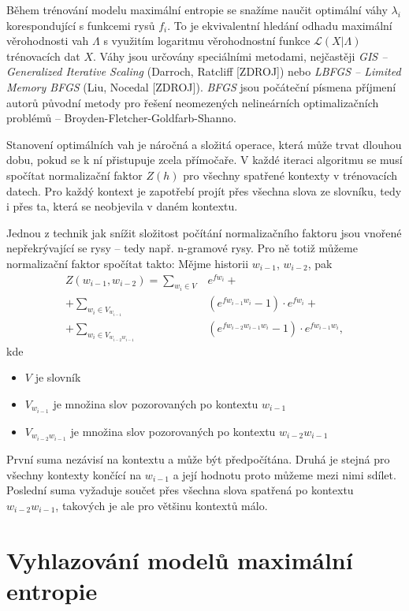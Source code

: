 \documentclass[12pt,a4paper]{report}
\begin{document}
Během trénování modelu maximální entropie se snažíme naučit optimální váhy $\lambda_i$ korespondující s funkcemi rysů $f_i$. To je ekvivalentní hledání odhadu maximální věrohodnosti vah $\Lambda$ s využitím logaritmu věrohodnostní funkce $\mathcal{L}(X|\Lambda)$ trénovacích dat $X$. Váhy jsou určovány speciálními metodami, nejčastěji \textit{GIS -- Generalized Iterative Scaling} (Darroch, Ratcliff [ZDROJ]) nebo \textit{LBFGS -- Limited Memory BFGS} (Liu, Nocedal [ZDROJ]). \textit{BFGS} jsou počáteční písmena příjmení autorů původní metody pro řešení neomezených nelineárních optimalizačních problémů -- Broyden-Fletcher-Goldfarb-Shanno.

Stanovení optimálních vah je náročná a složitá operace, která může trvat dlouhou dobu, pokud se k ní přistupuje zcela přímočaře. V každé iteraci algoritmu se musí spočítat normalizační faktor $Z(h)$ pro všechny spatřené kontexty v trénovacích datech. Pro každý kontext je zapotřebí projít přes všechna slova ze slovníku, tedy i přes ta, která se neobjevila v daném kontextu.

Jednou z technik jak snížit složitost počítání normalizačního faktoru jsou vnořené nepřekrývající se rysy -- tedy např. n-gramové rysy. Pro ně totiž můžeme normalizační faktor spočítat takto: Mějme historii $w_{i-1}$, $w_{i-2}$, pak
\begin{equation}
\begin{split}
Z(w_{i-1}, w_{i-2}) = \sum_{w_i \in V} & e^{fw_i} + \\ 
+ \sum_{w_i \in V_{w_{i-1}}} & (e^{fw_{i-1}w_i} - 1) \cdot e^{fw_i} + \\
+ \sum_{w_i \in V_{w_{i-2} w_{i-1}}} & (e^{fw_{i-2}w_{i-1}w_i} -1) \cdot e^{fw_{i-1}w_i},
\end{split}
\end{equation}
kde \begin{itemize}
\item{$V$ je slovník}
\item{$V_{w_{i-1}}$ je množina slov pozorovaných po kontextu $w_{i-1}$}
\item{$V_{w_{i-2}w_{i-1}}$ je množina slov pozorovaných po kontextu $w_{i-2}w_{i-1}$}
\end{itemize}
První suma nezávisí na kontextu a může být předpočítána. Druhá je stejná pro všechny kontexty končící na $w_{i-1}$ a její hodnotu proto můžeme mezi nimi sdílet. Poslední suma vyžaduje součet přes všechna slova spatřená po kontextu $w_{i-2}w_{i-1}$, takových je ale pro většinu kontextů málo.

\section{Vyhlazování modelů maximální entropie}
\end{document}
